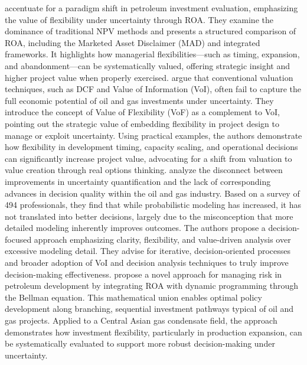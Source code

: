 \documentclass[pdflatex,sn-basic]{sn-jnl}%
\theoremstyle{thmstyleone}%
\theoremstyle{thmstyletwo}%
\theoremstyle{thmstylethree}%
\begin{document}
\cite{ref8} accentuate for a paradigm shift in petroleum investment evaluation, emphasizing the value of flexibility under uncertainty through ROA. They examine the dominance of traditional NPV methods and presents a structured comparison of ROA, including the Marketed Asset Disclaimer (MAD) and integrated frameworks. It highlights how managerial flexibilities—such as timing, expansion, and abandonment—can be systematically valued, offering strategic insight and higher project value when properly exercised. \cite{ref9} argue that conventional valuation techniques, such as DCF and Value of Information (VoI), often fail to capture the full economic potential of oil and gas investments under uncertainty. They introduce the concept of Value of Flexibility (VoF) as a complement to VoI, pointing out the strategic value of embedding flexibility in project design to manage or exploit uncertainty. Using practical examples, the authors demonstrate how flexibility in development timing, capacity scaling, and operational decisions can significantly increase project value, advocating for a shift from valuation to value creation through real options thinking. \cite{ref10} analyze the disconnect between improvements in uncertainty quantification and the lack of corresponding advances in decision quality within the oil and gas industry. Based on a survey of 494 professionals, they find that while probabilistic modeling has increased, it has not translated into better decisions, largely due to the misconception that more detailed modeling inherently improves outcomes. The authors propose a decision-focused approach emphasizing clarity, flexibility, and value-driven analysis over excessive modeling detail. They advise for iterative, decision-oriented processes and broader adoption of VoI and decision analysis techniques to truly improve decision-making effectiveness. \cite{ref11} propose a novel approach for managing risk in petroleum development by integrating ROA with dynamic programming through the Bellman equation. This mathematical union enables optimal policy development along branching, sequential investment pathways typical of oil and gas projects. Applied to a Central Asian gas condensate field, the approach demonstrates how investment flexibility, particularly in production expansion, can be systematically evaluated to support more robust decision-making under uncertainty.
\end{document}
